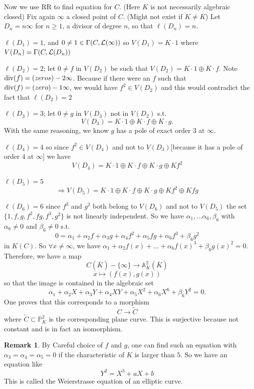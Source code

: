 \documentclass[11pt]{article}
\theoremstyle{definition}
\newtheorem{rmk}[thm]{Remark}
\newcommand{\affn}{\mathbb A}
\newcommand{\proj}{\mathbb P}
\newcommand{\call}{{\cal L}}
\renewcommand{\div}{\textnormal{div}}
\newcommand{\Lrta}{\Longrightarrow}
\newcommand{\lrta}{\longrightarrow}
\begin{document}
Now we use RR to find equation for $C$.  (Here $K$ is not necessarily algebraic closed) Fix again $\infty$ a closed point of $C$. (Might not exist if $K\neq \overline{K}$) Let $D_n=n\infty$ for $n\geq 1$, a divisor of degree $n$, so that $\ell(D_n)=n$. 

$\ell(D_1)=1$, and $0\neq 1 \in \Gamma(C,\call(\infty))$ so $V(D_1)=K\cdot 1$ where $V(D_n)=\Gamma(C,\call(D_n))$

$\ell(D_2)=2$; let $0\neq f$ in $V(D_2)$ be such that $V(D_2)=K\cdot 1\oplus K\cdot f$. Note $\div(f)=(zeros)-2\infty$. Because if there were an $f$ such that $\div (f)=(zero)-1\infty$, we would have $f^2\in V(D_2)$ and this would contradict the fact that $\ell(D_2)=2$

$\ell(D_3)=3$; let $0\neq g$ in $V(D_3)$ not in $V(D_2)$ s.t. 
$$
V(D_3)=K\cdot 1\oplus K\cdot f\oplus K \cdot g.
$$
With the same reasoning, we know $g$ has a pole of exact order $3$ at $\infty$.

$\ell(D_4)=4$ so since $f^2\in V(D_4)$ and not to $V(D_3)$[because it has a pole of order $4$ at $\infty$]  we have 
$$
V(D_4)=K\cdot 1\oplus K\cdot f\oplus K \cdot g\oplus K f^2
$$

$\ell(D_5)=5$
$$
\Lrta V(D_5)=K\cdot 1\oplus K\cdot f\oplus K \cdot g\oplus K f^2\oplus Kfg
$$

$\ell(D_6)=6$
since $f^3$ and $g^2$ both belong to $V(D_6)$ and not to $V(D_5) $ the set $\{1,f,g,f^2,fg,f^3,g^2\}$ is not linearly independent. So we have $\alpha_1,...\alpha_6,\beta_6$ with $\alpha_6\neq 0 $ and $\beta_6\neq 0$ s.t.
$$
0=\alpha_1+\alpha_2 f+\alpha_3 g+\alpha_4 f^2+\alpha_5 fg+\alpha_6 f^3+\beta_6 g^2
$$
in $K(C)$. So $\forall x\neq \infty$, we have $\alpha_1+\alpha_2 f(x)+...+\alpha_6 f(x)^3+\beta_6 g(x)^2=0$. Therefore, we have a map
$$
C(\overline{K})-\{\infty\}\lrta \affn^2_K(\overline{K})
$$
$$
x\longmapsto (f(x),g(x))
$$
so that the  image is contained in the algebraic set
$$
\alpha_1+\alpha_2X+\alpha_3Y+\alpha_4XY+\alpha_5 X^2+\alpha_6 X^6+\beta_6 Y^2=0.
$$
One proves that this corresponds to a morphism
$$
C\lrta\tilde{C}
$$
where $\tilde{C}\subset \proj^2_K$ is the corresponding plane curve. This is surjective because not constant and is in fact an isomorphism. 

\begin{rmk}
By Careful choice of $f$ and $g$, one can find such an equation with $\alpha_3=\alpha_4=\alpha_5=0$ if the characteristic of $K$ is larger than $5$. So we have an equation like 
$$
Y^2=X^3+aX+b
$$
This is called the Weierstrasse equation of an elliptic curve. 
\end{rmk}
\end{document}

